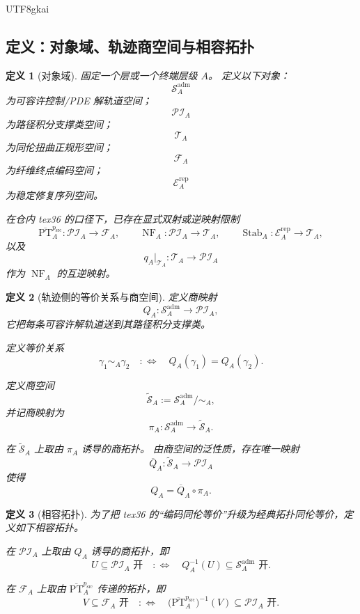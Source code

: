 \documentclass[12pt]{article}
\newtheorem{definition}{定义}[section]
\begin{document}
\begin{CJK*}{UTF8}{gkai}
\subsection{定义：对象域、轨迹商空间与相容拓扑}
\label{subsec:tex1-ch7-defs}

\begin{definition}[对象域]
\label{def:tex1-ch7-objects}
固定一个层或一个终端层级 \(A\)。
定义以下对象：
\[
  \mathcal S_A^{\mathrm{adm}}
\]
为可容许控制/PDE 解轨道空间；
\[
  \mathcal{PI}_A
\]
为路径积分支撑类空间；
\[
  \mathcal T_A
\]
为同伦扭曲正规形空间；
\[
  \mathcal F_A
\]
为纤维终点编码空间；
\[
  \mathcal E_A^{\mathrm{rep}}
\]
为稳定修复序列空间。

在仓内 tex36 的口径下，已存在显式双射或逆映射限制
\[
  \overline{\mathrm{PT}}_A^{p_{\mathrm{src}}}:\mathcal{PI}_A\to \mathcal F_A,
  \qquad
  \operatorname{NF}_A:\mathcal{PI}_A\to \mathcal T_A,
  \qquad
  \operatorname{Stab}_A:\mathcal E_A^{\mathrm{rep}}\to \mathcal T_A,
\]
以及
\[
  q_A|_{\mathcal T_A}:\mathcal T_A\to\mathcal{PI}_A
\]
作为 \(\operatorname{NF}_A\) 的互逆映射。
\end{definition}

\begin{definition}[轨迹侧的等价关系与商空间]
\label{def:tex1-ch7-quotient}
定义商映射
\[
  Q_A:\mathcal S_A^{\mathrm{adm}}\to \mathcal{PI}_A,
\]
它把每条可容许解轨道送到其路径积分支撑类。

定义等价关系
\[
  \gamma_1\sim_A\gamma_2
  \quad:\Longleftrightarrow\quad
  Q_A(\gamma_1)=Q_A(\gamma_2).
\]

定义商空间
\[
  \widetilde{\mathcal S}_A
  :=
  \mathcal S_A^{\mathrm{adm}}/\sim_A,
\]
并记商映射为
\[
  \pi_A:\mathcal S_A^{\mathrm{adm}}\to \widetilde{\mathcal S}_A.
\]

在 \(\widetilde{\mathcal S}_A\) 上取由 \(\pi_A\) 诱导的商拓扑。
由商空间的泛性质，存在唯一映射
\[
  \overline Q_A:\widetilde{\mathcal S}_A\to \mathcal{PI}_A
\]
使得
\[
  Q_A=\overline Q_A\circ \pi_A.
\]
\end{definition}

\begin{definition}[相容拓扑]
\label{def:tex1-ch7-topology}
为了把 tex36 的“编码同伦等价”升级为经典拓扑同伦等价，定义如下相容拓扑。

在 \(\mathcal{PI}_A\) 上取由 \(Q_A\) 诱导的商拓扑，即
\[
  U\subseteq \mathcal{PI}_A \text{ 开}
  \quad:\Longleftrightarrow\quad
  Q_A^{-1}(U)\subseteq \mathcal S_A^{\mathrm{adm}} \text{ 开}.
\]

在 \(\mathcal F_A\) 上取由 \(\overline{\mathrm{PT}}_A^{p_{\mathrm{src}}}\) 传递的拓扑，即
\[
  V\subseteq \mathcal F_A \text{ 开}
  \quad:\Longleftrightarrow\quad
  \bigl(\overline{\mathrm{PT}}_A^{p_{\mathrm{src}}}\bigr)^{-1}(V)\subseteq \mathcal{PI}_A \text{ 开}.
\]


\end{definition}
\end{CJK*}
\end{document}
